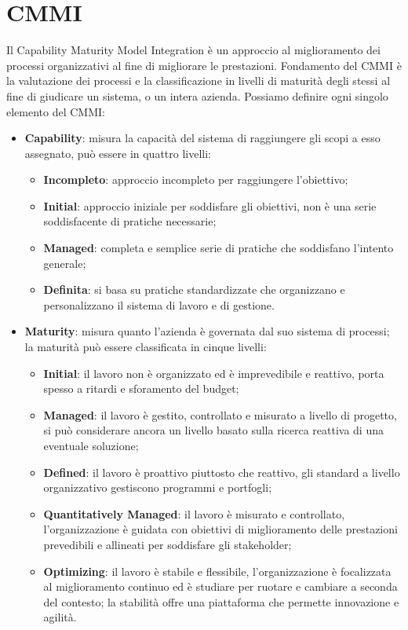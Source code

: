 \section{CMMI}\label{CMMISection}
Il Capability Maturity Model Integration è un approccio al miglioramento dei processi organizzativi al fine di migliorare le prestazioni. Fondamento del CMMI è la valutazione dei processi e la classificazione in livelli di maturità degli stessi al fine di giudicare un sistema, o un intera azienda. Possiamo definire ogni singolo elemento del CMMI:
\begin{itemize}
	\item \textbf{Capability}: misura la capacità del sistema di raggiungere gli scopi a esso assegnato, può essere  in quattro livelli:
	\begin{itemize}
		\item \textbf{Incompleto}: approccio incompleto per raggiungere l'obiettivo;
		\item \textbf{Initial}: approccio iniziale per soddisfare gli obiettivi, non è una serie soddisfacente di pratiche necessarie;
		\item \textbf{Managed}: completa e semplice serie di pratiche che soddisfano l'intento generale;
		\item \textbf{Definita}: si basa su pratiche standardizzate che organizzano e personalizzano il sistema di lavoro e di gestione.
	\end{itemize}	 
	\item \textbf{Maturity}: misura quanto l'azienda è governata dal suo sistema di processi; la maturità può essere classificata in cinque livelli:
	\begin{itemize}
		\item \textbf{Initial}: il lavoro non è organizzato ed è imprevedibile e reattivo, porta spesso a ritardi e sforamento del budget;
		\item \textbf{Managed}: il lavoro è gestito, controllato e misurato a livello di progetto, si può considerare ancora un livello basato sulla ricerca reattiva di una eventuale soluzione;
		\item \textbf{Defined}: il lavoro è proattivo piuttosto che reattivo, gli standard a livello organizzativo gestiscono programmi e portfogli;
		\item \textbf{Quantitatively Managed}: il lavoro è misurato e controllato, l'organizzazione è guidata con obiettivi di miglioramento delle prestazioni prevedibili e allineati per soddisfare gli stakeholder;
		\item \textbf{Optimizing}: il lavoro è stabile e flessibile, l'organizzazione è focalizzata al miglioramento continuo ed è studiare per ruotare e cambiare a seconda del contesto; la stabilità offre una piattaforma che permette innovazione e agilità.

\end{itemize}
\end{itemize}
